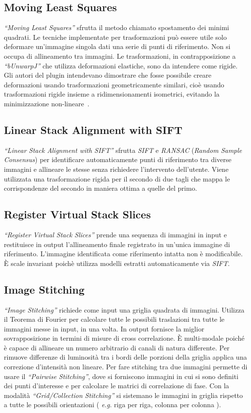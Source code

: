 \subsection{Moving Least Squares}
\noindent \textit{``Moving Least Squares''} sfrutta il metodo chiamato spostamento dei minimi quadrati. Le tecniche implementate per trasformazioni può essere utile solo deformare un'immagine singola dati una serie di punti di riferimento. Non si occupa di allineamento tra immagini. Le trasformazioni, in contrapposizione a \textit{``bUnwarpJ''} che utilizza deformazioni elastiche, sono da intendere come rigide. Gli autori del plugin intendevano dimostrare che fosse possibile creare deformazioni usando trasformazioni geometricamente similari, cioè usando trasformazioni rigide insieme a ridimensionamenti isometrici, evitando la minimizzazione non-lineare~\cite{10.1145/1141911.1141920}.

\subsection{Linear Stack Alignment with SIFT}
\noindent \textit{``Linear Stack Alignment with SIFT''} sfrutta \textit{SIFT} e \textit{RANSAC} (\textit{Random Sample Consensus}) per identificare automaticamente punti di riferimento tra diverse immagini e allineare le stesse senza richiedere l'intervento dell'utente. Viene utilizzata una trasformazione rigida per il secondo di due tagli che mappa le corrispondenze del secondo in maniera ottima a quelle del primo.

\subsection{Register Virtual Stack Slices}
\noindent \textit{``Register Virtual Stack Slices''} prende una sequenza di immagini in input e restituisce in output l'allineamento finale registrato in un'unica immagine di riferimento. L'immagine identificata come riferimento intatta non è modificabile. È scale invariant poichè utilizza modelli estratti automaticamente via \textit{SIFT}.

\subsection{Image Stitching}
\noindent \textit{``Image Stitching''} richiede come input una griglia quadrata di immagini. Utilizza il Teorema di Fourier per calcolare tutte le possibili traslazioni tra tutte le immagini messe in input, in una volta. In output fornisce la miglior sovrapposizione in termini di misure di cross correlazione. È multi-modale poiché è capace di allineare un numero arbitrario di canali di natura differente. Per rimuove differenze di luminosità tra i bordi delle porzioni della griglia applica una correzione d'intensità non lineare. Per fare stitching tra due immagini permette di usare il \textit{``Pairwise Stitching''}, dove si forniscono immagini in cui si sono definiti dei punti d'interesse e per calcolare le matrici di correlazione di fase.
Con la modalità \textit{``Grid/Collection Stitching''} si sistemano le immagini in griglia rispetto a tutte le possibili orientazioni ( \textit{e.g.} riga per riga, colonna per colonna ).

